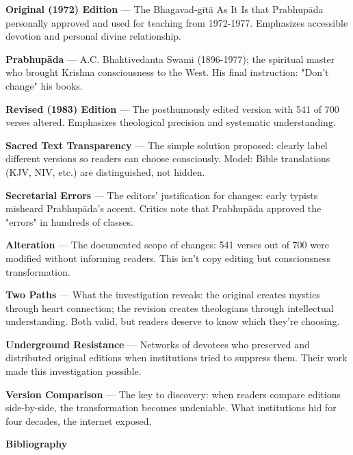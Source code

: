 \documentclass[12pt,twoside]{book}
\begin{document}
\textbf{\textbf{Original (1972) Edition}} — The Bhagavad-gītā As It Is that Prabhupāda personally approved and used for teaching from 1972-1977. Emphasizes accessible devotion and personal divine relationship.

\textbf{\textbf{Prabhupāda}} — A.C. Bhaktivedanta Swami (1896-1977); the spiritual master who brought Krishna consciousness to the West. His final instruction: "Don't change" his books.

\textbf{\textbf{Revised (1983) Edition}} — The posthumously edited version with 541 of 700 verses altered. Emphasizes theological precision and systematic understanding.

\textbf{\textbf{Sacred Text Transparency}} — The simple solution proposed: clearly label different versions so readers can choose consciously. Model: Bible translations (KJV, NIV, etc.) are distinguished, not hidden.

\textbf{\textbf{Secretarial Errors}} — The editors' justification for changes: early typists misheard Prabhupāda's accent. Critics note that Prabhupāda approved the "errors" in hundreds of classes.

\textbf{\textbf{Alteration}} — The documented scope of changes: 541 verses out of 700 were modified without informing readers. This isn't copy editing but consciousness transformation.

\textbf{\textbf{Two Paths}} — What the investigation reveals: the original creates mystics through heart connection; the revision creates theologians through intellectual understanding. Both valid, but readers deserve to know which they're choosing.

\textbf{\textbf{Underground Resistance}} — Networks of devotees who preserved and distributed original editions when institutions tried to suppress them. Their work made this investigation possible.

\textbf{\textbf{Version Comparison}} — The key to discovery: when readers compare editions side-by-side, the transformation becomes undeniable. What institutions hid for four decades, the internet exposed.

\clearpage
\thispagestyle{empty}
\mbox{}
\newpage
\pagestyle{sectionopening}
\thispagestyle{sectionopening}
\markboth{}{}
\markright{}
\vspace*{0.25\textheight}
\begin{center}
{\Huge\bfseries Bibliography}
\end{center}
\newpage
\pagestyle{sectionopening}
\thispagestyle{sectionopening}
\end{document}
